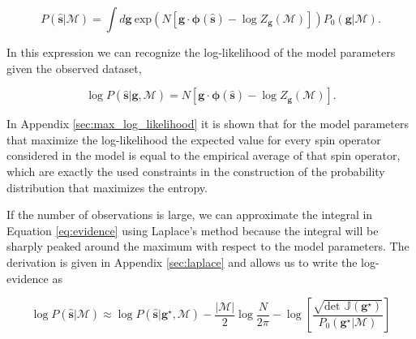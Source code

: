 \begin{equation} \label{eq:evidence}
    P(\mathbf{\hat{s}}|\mathcal{M}) = \int d\mathbf{g} \: \text{exp}\left( N  \left[ \mathbf{g} \cdot \boldsymbol{\phi}(\mathbf{\hat{s}}) - \log {Z_\mathbf{g}(\mathcal{M})} \right] \right) P_0(\mathbf{g}|\mathcal{M}).
\end{equation}

\noindent
In this expression we can recognize the log-likelihood of the model parameters given the observed dataset,

\begin{equation} \label{eq:log_likelihood}
    \log P(\mathbf{\hat{s}} | \mathbf{g}, \mathcal{M}) = N  \left[ \mathbf{g} \cdot \boldsymbol{\phi}(\mathbf{\hat{s}}) - \log {Z_\mathbf{g}(\mathcal{M})} \right].
\end{equation}

\noindent
In Appendix \ref{sec:max_log_likelihood} it is shown that for the model parameters that maximize the log-likelihood the expected value for every spin operator considered in the model is equal to the empirical average of that spin operator, which are exactly the used constraints in the construction of the probability distribution that maximizes the entropy.

If the number of observations is large, we can approximate the integral in Equation \ref{eq:evidence} using Laplace's method because the integral will be sharply peaked around the maximum with respect to the model parameters.
The derivation is given in Appendix \ref{sec:laplace} and allows us to write the log-evidence as

\begin{equation}
    \log P(\mathbf{\hat{s}}|\mathcal{M}) \approx \log P(\mathbf{\hat{s}} | \mathbf{g}^\star, \mathcal{M}) -  \frac{|\mathcal{M}|}{2} \log \frac{N}{2 \pi} - \log \left[ \frac{\sqrt{\text{det } \mathbb{J}(\mathbf{g}^\star)}}{P_0(\mathbf{g}^\star|\mathcal{M})} \right]
\end{equation}

